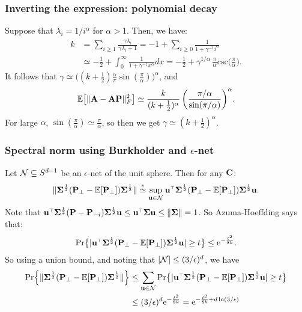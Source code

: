 \documentclass[10pt]{beamer}
\begin{document}
\begin{frame}
  \frametitle{Inverting the expression: polynomial decay}
  Suppose that $\lambda_i = 1/i^\alpha$ for $\alpha>1$. Then, we have:
  \begin{align*}
    k&=  \sum_{i\geq 1} \frac{\gamma\lambda_i}{\gamma\lambda_i+1}
       =-1 + \sum_{i\geq 0}\frac1{1 + \gamma^{-1}i^\alpha}
    \\
&\simeq -\frac12+\int_0^\infty \frac1{1 + \gamma^{-1}x^\alpha}dx = -\frac12 +
         \gamma^{1/\alpha}\,\frac\pi\alpha\mathrm{csc}\Big(\frac\pi\alpha\Big).
  \end{align*}
  It follows that $\gamma \simeq
  \big((k+\frac12)\frac\alpha\pi\sin(\frac\pi\alpha)\big)^\alpha$, and
  \begin{align*}
    \mathbb E\big[\|\mathbf A-\mathbf A\mathbf P\|_F^2\big]\simeq \frac
    k{(k+\frac12)^\alpha}\,\bigg(\frac{\pi/\alpha}{\sin(\pi/\alpha)}\bigg)^\alpha. 
  \end{align*}
  For large $\alpha$, 
  $\sin(\frac\pi\alpha)\simeq\frac\pi\alpha$,
  so then we get $\gamma\simeq (k+\frac12)^\alpha$.
\end{frame}

  \begin{frame}
    \frametitle{Spectral norm using Burkholder and $\epsilon$-net}
    Let $\mathcal{N}\subseteq S^{d-1}$ be an $\epsilon$-net of the unit
    sphere. Then for any $\mathbf C$:
    \begin{align*}
      \|\Sigmab^{\frac12}(\P_{\perp}-\E[\P_{\perp}])\Sigmab^{\frac12}\|
      \overset\epsilon\simeq
      \sup_{\u\in\Nc}\u^\top\Sigmab^{\frac12}
      (\P_{\perp}-\E[\P_{\perp}])\Sigmab^{\frac12}\u.
    \end{align*}
Note that $\u^\top\Sigmab^{\frac12}(\P-\P_{-i})\Sigmab^{\frac12}\u\leq
\u^\top\Sigmab\u\leq \|\Sigmab\|=1$. So Azuma-Hoeffding says that:
    \begin{align*}
      \Pr\big\{|\u^\top\Sigmab^{\frac12}(\P_{\perp}-\E[\P_{\perp}])\Sigmab^{\frac12}\u|\geq t\big\}\leq
      \ee^{-\frac{t^2}{8k}}.
    \end{align*}
    So using a union bound, and noting that $|\mathcal{N}|\leq (3/\epsilon)^d$, we have 
    \begin{align*}
      \Pr\Big\{\|\Sigmab^{\frac12}(\P_{\perp}-\E[\P_{\perp}])\Sigmab^{\frac12}\|\Big\}
      &\leq \sum_{\u\in\Nc}
\Pr\big\{|\u^\top\Sigmab^{\frac12}(\P_{\perp}-\E[\P_{\perp}])\Sigmab^{\frac12}\u|\geq
        t\big\}
        \\
      &\leq (3/\epsilon)^d\ee^{-\frac{t^2}{8k}} =
        \ee^{-\frac{t^2}{8k} + d\ln(3/\epsilon)}
    \end{align*}    
  \end{frame}
\end{document}
